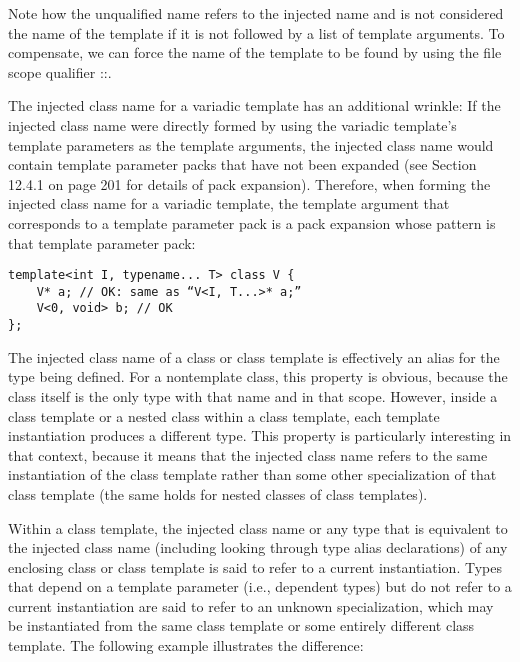 Note how the unqualified name refers to the injected name and is not considered the name of the template if it is not followed by a list of template arguments. To compensate, we can force the name of the template to be found by using the file scope qualifier ::.

The injected class name for a variadic template has an additional wrinkle: If the injected class name were directly formed by using the variadic template’s template parameters as the template arguments, the injected class name would contain template parameter packs that have not been expanded (see Section 12.4.1 on page 201 for details of pack expansion). Therefore, when forming the injected class name for a variadic template, the template argument that corresponds to a template parameter pack is a pack expansion whose pattern is that template parameter pack:

\begin{lstlisting}[style=styleCXX]
template<int I, typename... T> class V {
	V* a; // OK: same as “V<I, T...>* a;”
	V<0, void> b; // OK
};
\end{lstlisting}


The injected class name of a class or class template is effectively an alias for the type being defined. For a nontemplate class, this property is obvious, because the class itself is the only type with that name and in that scope. However, inside a class template or a nested class within a class template, each template instantiation produces a different type. This property is particularly interesting in that context, because it means that the injected class name refers to the same instantiation of the class template rather than some other specialization of that class template (the same holds for nested classes of class templates).

Within a class template, the injected class name or any type that is equivalent to the injected class name (including looking through type alias declarations) of any enclosing class or class template is said to refer to a current instantiation. Types that depend on a template parameter (i.e., dependent types) but do not refer to a current instantiation are said to refer to an unknown specialization, which may be instantiated from the same class template or some entirely different class template. The following example illustrates the difference:

